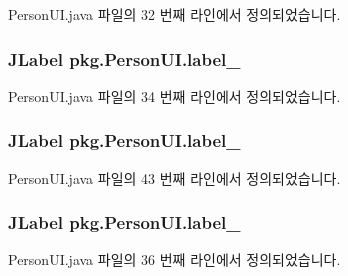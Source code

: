 Person\+U\+I.\+java 파일의 32 번째 라인에서 정의되었습니다.

\subsubsection[{\texorpdfstring{label\+\_\+2}{label_2}}]{\setlength{\rightskip}{0pt plus 5cm}J\+Label pkg.\+Person\+U\+I.\+label\+\_\hspace{0.3cm}{\ttfamily [private]}}\hypertarget{classpkg_1_1_person_u_i_af40d666a6f4a8b9fd70d773377b85d23}{}\label{classpkg_1_1_person_u_i_af40d666a6f4a8b9fd70d773377b85d23}


Person\+U\+I.\+java 파일의 34 번째 라인에서 정의되었습니다.

\subsubsection[{\texorpdfstring{label\+\_\+3}{label_3}}]{\setlength{\rightskip}{0pt plus 5cm}J\+Label pkg.\+Person\+U\+I.\+label\+\_\hspace{0.3cm}{\ttfamily [private]}}\hypertarget{classpkg_1_1_person_u_i_a6f0d2bbe796a121c3d68046ac8f8e7e3}{}\label{classpkg_1_1_person_u_i_a6f0d2bbe796a121c3d68046ac8f8e7e3}


Person\+U\+I.\+java 파일의 43 번째 라인에서 정의되었습니다.

\subsubsection[{\texorpdfstring{label\+\_\+4}{label_4}}]{\setlength{\rightskip}{0pt plus 5cm}J\+Label pkg.\+Person\+U\+I.\+label\+\_\hspace{0.3cm}{\ttfamily [private]}}\hypertarget{classpkg_1_1_person_u_i_ace0f99b0457a8e521a18fb1026b7c885}{}\label{classpkg_1_1_person_u_i_ace0f99b0457a8e521a18fb1026b7c885}


Person\+U\+I.\+java 파일의 36 번째 라인에서 정의되었습니다.

